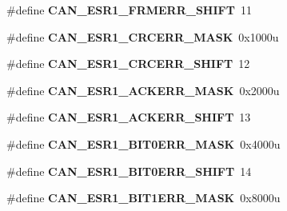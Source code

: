 \begin{DoxyCompactItemize}
\item 
\#define {\bfseries C\+A\+N\+\_\+\+E\+S\+R1\+\_\+\+F\+R\+M\+E\+R\+R\+\_\+\+S\+H\+I\+FT}~11\hypertarget{group__CAN__Register__Masks_ga0efc518d9eecfd7ed1eaefac3fd8ec23}{}\label{group__CAN__Register__Masks_ga0efc518d9eecfd7ed1eaefac3fd8ec23}

\item 
\#define {\bfseries C\+A\+N\+\_\+\+E\+S\+R1\+\_\+\+C\+R\+C\+E\+R\+R\+\_\+\+M\+A\+SK}~0x1000u\hypertarget{group__CAN__Register__Masks_gaaafa0a40c19015f5bc060267b18f2433}{}\label{group__CAN__Register__Masks_gaaafa0a40c19015f5bc060267b18f2433}

\item 
\#define {\bfseries C\+A\+N\+\_\+\+E\+S\+R1\+\_\+\+C\+R\+C\+E\+R\+R\+\_\+\+S\+H\+I\+FT}~12\hypertarget{group__CAN__Register__Masks_ga1df87f92bcad133cc7c2677958c95ce4}{}\label{group__CAN__Register__Masks_ga1df87f92bcad133cc7c2677958c95ce4}

\item 
\#define {\bfseries C\+A\+N\+\_\+\+E\+S\+R1\+\_\+\+A\+C\+K\+E\+R\+R\+\_\+\+M\+A\+SK}~0x2000u\hypertarget{group__CAN__Register__Masks_ga10e077761a90dda3310ffc53a98569a7}{}\label{group__CAN__Register__Masks_ga10e077761a90dda3310ffc53a98569a7}

\item 
\#define {\bfseries C\+A\+N\+\_\+\+E\+S\+R1\+\_\+\+A\+C\+K\+E\+R\+R\+\_\+\+S\+H\+I\+FT}~13\hypertarget{group__CAN__Register__Masks_gabe4b1042038801b2ec9d302339d6869b}{}\label{group__CAN__Register__Masks_gabe4b1042038801b2ec9d302339d6869b}

\item 
\#define {\bfseries C\+A\+N\+\_\+\+E\+S\+R1\+\_\+\+B\+I\+T0\+E\+R\+R\+\_\+\+M\+A\+SK}~0x4000u\hypertarget{group__CAN__Register__Masks_gadd6b78abb7a9321af68208f318c7c116}{}\label{group__CAN__Register__Masks_gadd6b78abb7a9321af68208f318c7c116}

\item 
\#define {\bfseries C\+A\+N\+\_\+\+E\+S\+R1\+\_\+\+B\+I\+T0\+E\+R\+R\+\_\+\+S\+H\+I\+FT}~14\hypertarget{group__CAN__Register__Masks_ga949e83e6333f8b4ddd5b2fb77585e2e9}{}\label{group__CAN__Register__Masks_ga949e83e6333f8b4ddd5b2fb77585e2e9}

\item 
\#define {\bfseries C\+A\+N\+\_\+\+E\+S\+R1\+\_\+\+B\+I\+T1\+E\+R\+R\+\_\+\+M\+A\+SK}~0x8000u\hypertarget{group__CAN__Register__Masks_ga8a260202c5a157354042a1fba8cbc882}{}\label{group__CAN__Register__Masks_ga8a260202c5a157354042a1fba8cbc882}


\end{DoxyCompactItemize}
